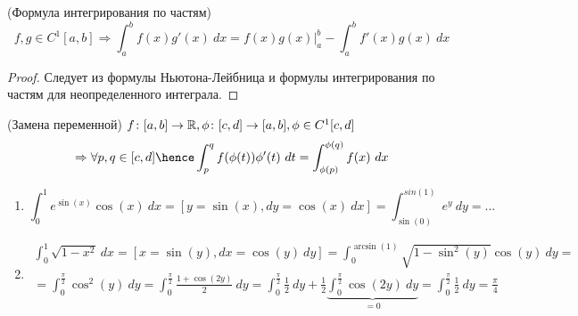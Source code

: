 \begin{properties}
    \item(Формула интегрирования по частям)
    \[f, g \in C^1[a, b] \Rightarrow
    \int_a^b f(x) g'(x)\ dx = f(x)g(x)\bigg|_a^b - \int_a^b f'(x)g(x)\ dx \]

    \begin{proof}
        Следует из формулы Ньютона-Лейбница и формулы интегрирования по частям для неопределенного интеграла.
    \end{proof}

    \item(Замена переменной) $ f\colon [a, b] \to \mathbb{R}, \phi\colon [c, d] \to [a, b], \phi \in C^1[c, d]$ 
    \[\Rightarrow
    \forall p, q \in [c, d] \hence \int_p^q f(\phi(t)) \phi'(t)\ dt
    = \int_{\phi(p)}^{\phi(q)} f(x)\ dx\]

    \begin{example}
        \begin{enumerate}
            \item 
            \[
                \int_0^1 e^{\sin(x)} \cos(x) \ dx = [y = \sin(x), dy = \cos(x)\ dx] 
                = \int_{\sin(0)}^{sin(1)} e^y \ dy = \ldots
            \]
            \item 
            \[
                \begin{gathered}
                    \int_0^1 \sqrt{1 - x^2} \ dx = [x = \sin(y), dx 
                    = \cos(y)\ dy] =
                    \int_0^{\arcsin(1)} \sqrt{1 - \sin^2(y)} \cos(y) \ dy 
                    =\\= \int_0^{\frac \pi 2} \cos^2(y) \ dy 
                    = \int_0^{\frac \pi 2} \frac {1 + \cos(2y)} 2 \ dy
                    = \int_0^{\frac \pi 2} \frac 1 2 \ dy + 
                    \frac{1}{2}\underbrace{\int_0^{\frac \pi 2} \cos(2y) \ dy}_{=0}
                    = \int_0^{\frac \pi 2} \frac 1 2 \ dy
                    = \frac \pi 4
                \end{gathered}
            \]
        \end{enumerate}
    \end{example}
\end{properties}
